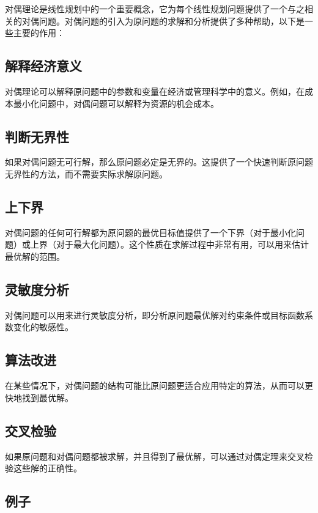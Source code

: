 \documentclass[12pt, a4paper, oneside]{ctexart}
\begin{document}
对偶理论是线性规划中的一个重要概念，它为每个线性规划问题提供了一个与之相关的对偶问题。对偶问题的引入为原问题的求解和分析提供了多种帮助，以下是一些主要的作用：

\subsection{解释经济意义}

对偶理论可以解释原问题中的参数和变量在经济或管理科学中的意义。例如，在成本最小化问题中，对偶问题可以解释为资源的机会成本。

\subsection{判断无界性}

如果对偶问题无可行解，那么原问题必定是无界的。这提供了一个快速判断原问题无界性的方法，而不需要实际求解原问题。

\subsection{上下界}

对偶问题的任何可行解都为原问题的最优目标值提供了一个下界（对于最小化问题）或上界（对于最大化问题）。这个性质在求解过程中非常有用，可以用来估计最优解的范围。

\subsection{灵敏度分析}

对偶问题可以用来进行灵敏度分析，即分析原问题最优解对约束条件或目标函数系数变化的敏感性。

\subsection{算法改进}

在某些情况下，对偶问题的结构可能比原问题更适合应用特定的算法，从而可以更快地找到最优解。

\subsection{交叉检验}

如果原问题和对偶问题都被求解，并且得到了最优解，可以通过对偶定理来交叉检验这些解的正确性。

\subsection{例子}
\end{document}
